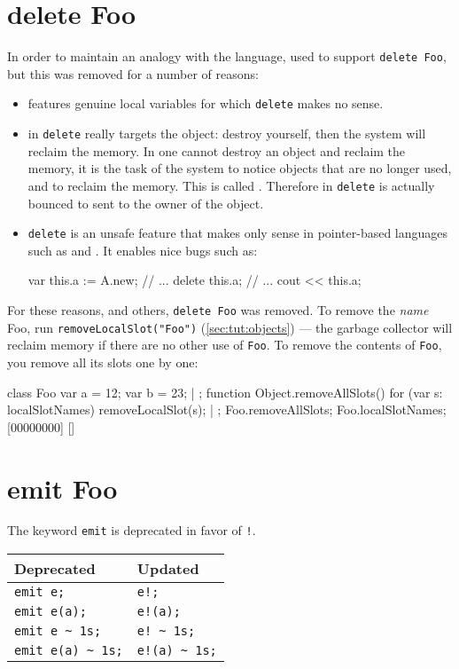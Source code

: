 \section{delete Foo}
\label{sec:k1:delete}
In order to maintain an analogy with the \Cxx language, \us used to
support \lstinline{delete Foo}, but this was removed for a number of
reasons:
\begin{itemize}
\item {} features genuine local variables for which
  \lstinline{delete} makes no sense.
\item in \Cxx \lstinline{delete} really targets the object: destroy
  yourself, then the system will reclaim the memory.  In \us one cannot
  destroy an object and reclaim the memory, it is the task of the system to
  notice objects that are no longer used, and to reclaim the memory.  This
  is called .  Therefore in \us \lstinline{delete}
  is actually bounced to  sent to the owner
  of the object.
\item \lstinline{delete} is an unsafe feature that makes only sense in
  pointer-based languages such as \C and \Cxx.  It enables nice bugs
  such as:
\begin{urbiunchecked}
var this.a := A.new;
// ...
delete this.a;
// ...
cout << this.a;
\end{urbiunchecked}
\end{itemize}

For these reasons, and others, \lstinline{delete Foo} was removed.  To
remove the \emph{name} Foo, run {\lstinline{removeLocalSlot("Foo")}}
(\autoref{sec:tut:objects}) --- the garbage collector will reclaim memory if
there are no other use of \lstinline{Foo}.  To remove the contents of
\lstinline{Foo}, you remove all its slots one by one:

\begin{urbiscript}[firstnumber=1]
class Foo
{
  var a = 12;
  var b = 23;
} | {};
function Object.removeAllSlots()
{
  for (var s: localSlotNames)
    removeLocalSlot(s);
} | {};
Foo.removeAllSlots;
Foo.localSlotNames;
[00000000] []
\end{urbiscript}

\section{emit Foo}
\label{sec:k1:emit}
The keyword \lstinline{emit} is deprecated in favor of \lstinline{!}.

\begin{center}
  \begin{tabular}{|l|l|}
    \hline
    \textbf{Deprecated} & \textbf{Updated}  \\
    \hline
    \lstinline|emit e;|         & \lstinline|e!;|          \\
    \lstinline|emit e(a);|      & \lstinline|e!(a);|       \\
    \lstinline|emit e ~ 1s;|    & \lstinline|e! ~ 1s;|     \\
    \lstinline|emit e(a) ~ 1s;| & \lstinline|e!(a) ~ 1s;|  \\
    \hline
  \end{tabular}
\end{center}

